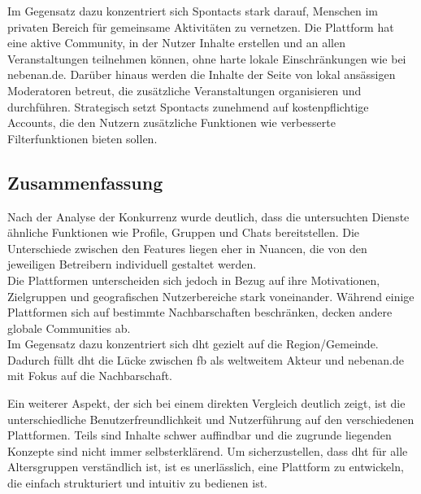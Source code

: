 Im Gegensatz dazu konzentriert sich Spontacts stark darauf, Menschen im privaten Bereich für gemeinsame Aktivitäten zu vernetzen. Die Plattform hat eine aktive Community, in der Nutzer Inhalte erstellen und an allen Veranstaltungen teilnehmen können, ohne harte lokale Einschränkungen wie bei nebenan.de. Darüber hinaus werden die Inhalte der Seite von lokal ansässigen Moderatoren betreut, die zusätzliche Veranstaltungen organisieren und durchführen. Strategisch setzt Spontacts zunehmend auf kostenpflichtige Accounts, die den Nutzern zusätzliche Funktionen wie verbesserte Filterfunktionen bieten sollen.

\subsection{Zusammenfassung}

Nach der Analyse der Konkurrenz wurde deutlich, dass die untersuchten Dienste ähnliche Funktionen wie Profile, Gruppen und Chats bereitstellen. Die Unterschiede zwischen den Features liegen eher in Nuancen, die von den jeweiligen Betreibern individuell gestaltet werden. \\
Die Plattformen unterscheiden sich jedoch in Bezug auf ihre Motivationen, Zielgruppen und geografischen Nutzerbereiche stark voneinander. Während einige Plattformen sich auf bestimmte Nachbarschaften beschränken, decken andere globale Communities ab. \\
Im Gegensatz dazu konzentriert sich \acrshort{dht} gezielt auf die Region/Gemeinde. Dadurch füllt \acrshort{dht} die Lücke zwischen \acrshort{fb} als weltweitem Akteur und nebenan.de mit Fokus auf die Nachbarschaft.

Ein weiterer Aspekt, der sich bei einem direkten Vergleich deutlich zeigt, ist die unterschiedliche Benutzerfreundlichkeit und Nutzerführung auf den verschiedenen Plattformen. Teils sind Inhalte schwer auffindbar und die zugrunde liegenden Konzepte sind nicht immer selbsterklärend. Um sicherzustellen, dass \acrshort{dht} für alle Altersgruppen verständlich ist, ist es unerlässlich, eine Plattform zu entwickeln, die einfach strukturiert und intuitiv zu bedienen ist.

